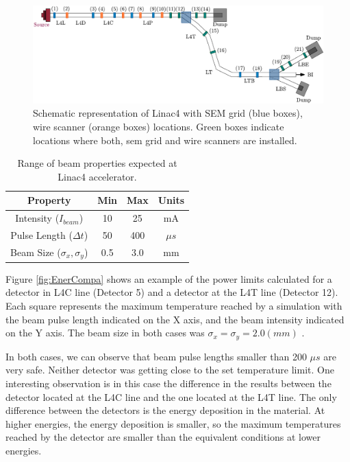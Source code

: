 \begin{figure}[h]
    \centering
    \includegraphics[width=1.0\columnwidth]{Figure_Linac4Instrumetnation/DetecPos.pdf}
    \caption{Schematic representation of Linac4 with SEM grid (blue boxes), wire scanner (orange boxes) locations. Green boxes indicate locations where both, sem grid and wire scanners are installed.}
    \label{fig:DetLoc}
\end{figure}


\begin{table}[h]
    \centering
    \begin{tabular}{cccc}
    \hline
    Property                          & Min & Max & Units   \\ \hline
    Intensity ($I_{beam}$)            & 10  & 25  & mA      \\
    Pulse Length ($\Delta t$)         & 50  & 400 & $\mu s$ \\
    Beam Size ($\sigma_x , \sigma_y$) & 0.5 & 3.0 & mm      \\ \hline
    \end{tabular}
    \caption{Range of beam properties expected at Linac4 accelerator.}
    \label{tab:beamprop}
\end{table}

Figure \ref{fig:EnerCompa} shows an example of the power limits calculated for a detector in L4C line (Detector 5) and a detector at the L4T line (Detector 12). Each square represents the maximum temperature reached by a simulation with the beam pulse length indicated on the X axis, and the beam intensity indicated on the Y axis. The beam size in both cases was $\sigma_x = \sigma_y = 2.0 (mm)$ . 

In both cases, we can observe that beam pulse lengths smaller than 200 $\mu s$ are very safe. Neither detector was getting close to the set temperature limit. One interesting observation is in this case the difference in the results between the detector located at the L4C line and the one located at the L4T line. The only difference between the detectors is the energy deposition in the material. At higher energies, the energy deposition is smaller, so the maximum temperatures reached by the detector are smaller than the equivalent conditions at lower energies. 

